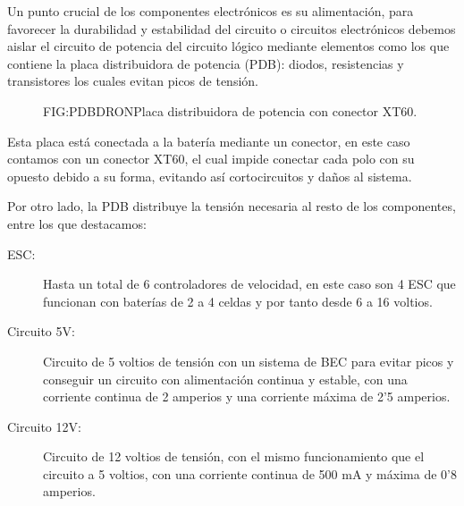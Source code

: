 
Un punto crucial de los componentes electrónicos es su alimentación, para favorecer la durabilidad y estabilidad del circuito o circuitos electrónicos debemos aislar el circuito de potencia del circuito lógico mediante elementos como los que contiene la placa distribuidora de potencia (PDB): diodos, resistencias y transistores los cuales evitan picos de tensión.

\begin{figure}{FIG:PDBDRON}{Placa distribuidora de potencia con conector XT60.}
\end{figure}

Esta placa está conectada a la batería mediante un conector, en este caso contamos con un conector XT60, el cual impide conectar cada polo con su opuesto debido a su forma, evitando así cortocircuitos y daños al sistema.

Por otro lado, la PDB distribuye la tensión necesaria al resto de los componentes, entre los que destacamos:

\begin{description}
        \item[ESC:] Hasta un total de 6 controladores de velocidad, en este caso son 4 ESC que funcionan con baterías de 2 a 4 celdas y por tanto desde 6 a 16 voltios.
        \item [Circuito 5V:] Circuito de 5 voltios de tensión con un sistema de BEC para evitar picos y conseguir un circuito con alimentación continua y estable, con una corriente continua de 2 amperios y una corriente máxima de 2'5 amperios.
        \item [Circuito 12V:] Circuito de 12 voltios de tensión, con el mismo funcionamiento que el circuito a 5 voltios, con una corriente continua de 500 mA y máxima de 0'8 amperios.
\end{description}

